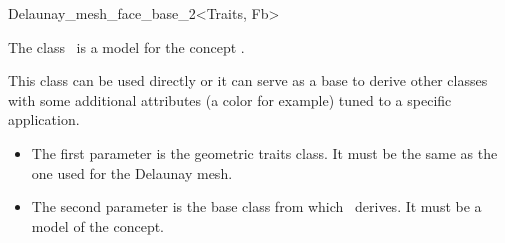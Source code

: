 \begin{ccRefClass}{Delaunay_mesh_face_base_2<Traits, Fb>}

\ccDefinition

The class \ccRefName\ is a model for the concept
.

This class can be used directly or it can serve as a base to derive other
classes with some additional attributes (a color for example) tuned to a
specific application.


\ccParameters

\begin{itemize}
\item The first parameter  is the geometric traits class. It must
  be the same as the one used for the Delaunay mesh.
\item The second parameter  is the base class from which \ccRefName\ 
  derives. It must be a model of the  concept.
\end{itemize}
\ccInheritsFrom
{}

\ccIsModel
{}
\end{ccRefClass}

